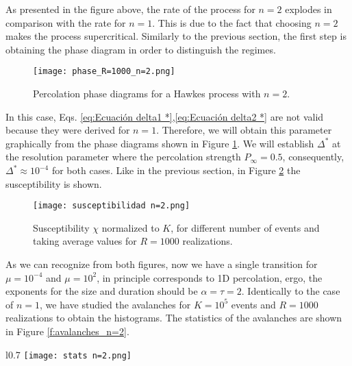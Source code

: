 As presented in the figure above, the rate of the process for $n=2$ explodes in comparison with the rate for $n=1$. This is due to the fact that choosing $n=2$ makes the process supercritical.
Similarly to the previous section, the first step is obtaining the phase diagram in order to distinguish the regimes. 

\begin{figure}[H]
    \centering
    \texttt{[image: phase\_R=1000\_n=2.png]}
    \caption{Percolation phase diagrams for a Hawkes process with $n=2$.}
    \label{f:phase_diagram_n=2}
\end{figure}
In this case, Eqs. \ref{eq:Ecuación delta1 *},\ref{eq:Ecuación delta2 *} are not valid because they were derived for $n=1$. 
Therefore, we will obtain this parameter graphically from the phase diagrams shown in Figure \ref{f:phase_diagram_n=2}. We will establish $\Delta^*$ at the resolution parameter where the
percolation strength $P_{\infty} = 0.5$, consequently, $\Delta^*\approx 10^{-4}$ for both cases. Like in the previous section, in Figure \ref{f:susceptibilidad_n=2} the susceptibility is shown.

\begin{figure}[H]
    \centering
    \texttt{[image: susceptibilidad n=2.png]}
    \caption{Susceptibility $\chi$ normalized to $K$, for different number of events and taking average values for $R=1000$ realizations.}
    \label{f:susceptibilidad_n=2}
\end{figure}


As we can recognize from both figures, now we have a single transition for $\mu=10^{-4}$ and $\mu=10^2$, in principle corresponds to 1D percolation, ergo, 
the exponents for the size and duration should be $\alpha=\tau=2$. Identically to the case of $n=1$, we have studied the avalanches for $K=10^5$ events and $R=1000$ realizations to 
obtain the histograms. The statistics of the avalanches are shown in Figure \ref{f:avalanches_n=2}.

\begin{wrapfigure}{l}{0.7\textwidth}
      \texttt{[image: stats n=2.png]}
    \caption{Avalanche statistics for a self-exciting Hawkes process with $n=2$ for $K=10^5$ events. The histograms have been calculated over $R=1000$ time series.}
    \label{f:avalanches_n=2}
\end{wrapfigure}

